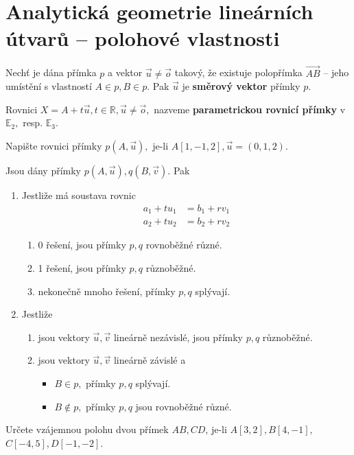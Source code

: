 \section{Analytická geometrie lineárních útvarů -- polohové vlastnosti}
\begin{definition}
    Nechť je dána přímka $p$ a vektor $\vec u\ne \vec o$
    takový, že existuje polopřímka $\overrightarrow{AB}$ --
    jeho umístění s vlastností $A\in p, B\in p.$ Pak $\vec u$
    je \textbf{směrový vektor} přímky $p.$
\end{definition}

\begin{definition}
    Rovnici $X = A+t\vec u, t\in \mathbb R, \vec u \ne  \vec o,$ nazveme
    \textbf{parametrickou rovnicí přímky} v $\mathbb E_2,$ resp. $\mathbb E_3.$
\end{definition}

\begin{priklad}
Napište rovnici přímky $p(A,\vec u),$ je-li $A[1,-1,2], \vec u = (0,1,2).$
\end{priklad}

\begin{veta}
    Jsou dány přímky $p(A,\vec u), q(B,\vec v).$ Pak
    \begin{enumerate}[$i.$]
    \item Jestliže má soustava rovnic
    \begin{align*}
        a_1+tu_1 &= b_1 + rv_1 \\
        a_2+tu_2 &= b_2 + rv_2
    \end{align*}
    \begin{enumerate}[$a.$]
    \item 0 řešení, jsou přímky $p,q$ rovnoběžné různé.
   	\item 1 řešení, jsou přímky $p,q$ různoběžné.
   	\item nekonečně mnoho řešení, přímky $p,q$ splývají.
    \end{enumerate}
   	\item Jestliže
    \begin{enumerate}[$a.$]
    \item jsou vektory $\vec u, \vec v$ lineárně nezávislé, jsou přímky $p,q$ různoběžné.
   	\item jsou vektory $\vec u, \vec v$ lineárně závislé a
   	\begin{itemize}
    \item $B\in p,$ přímky $p,q$ splývají.
   	\item $B\notin p,$ přímky $p,q$ jsou rovnoběžné různé.
    \end{itemize}
    \end{enumerate}
    \end{enumerate}
\end{veta}
\begin{priklad}
Určete vzájemnou polohu dvou přímek $AB, CD$, je-li $A[3,2], B[4,-1],$\linebreak $C[-4,5],D[-1,-2]$.
\end{priklad}

